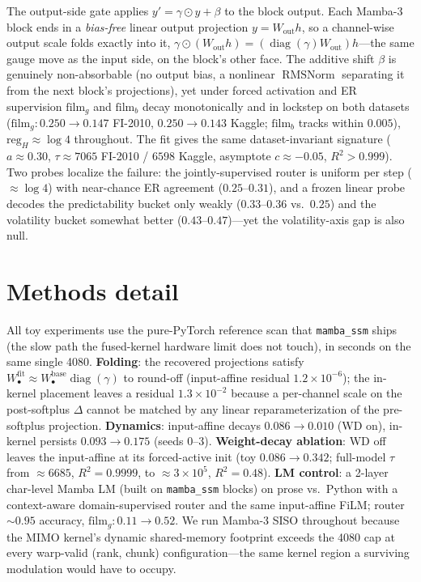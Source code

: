 \documentclass{article}
\DeclareMathOperator{\diagop}{diag}
\newcommand{\diag}{\diagop}
\DeclareMathOperator{\RMSNorm}{RMSNorm}
\begin{document}
The output-side gate applies $y'=\gamma\odot y+\beta$ to the block output. Each
Mamba-3 block ends in a \emph{bias-free} linear output projection
$y=W_{\text{out}}h$, so a channel-wise output scale folds exactly into it,
$\gamma\odot(W_{\text{out}}h)=(\diag(\gamma)W_{\text{out}})h$---the same gauge move
as the input side, on the block's other face. The additive shift $\beta$ is
genuinely non-absorbable (no output bias, a nonlinear $\RMSNorm$ separating it from
the next block's projections), yet under forced activation and ER supervision
$\mathrm{film}_g$ and $\mathrm{film}_b$ decay monotonically and in lockstep on both
datasets ($\mathrm{film}_g: 0.250\!\to\!0.147$ FI-2010, $0.250\!\to\!0.143$ Kaggle;
$\mathrm{film}_b$ tracks within $0.005$), $\mathrm{reg}_H\approx\log 4$ throughout.
The fit gives the same dataset-invariant signature ($a\approx0.30$,
$\tau\approx7065$ FI-2010 / $6598$ Kaggle, asymptote $c\approx-0.05$, $R^2>0.999$).
Two probes localize the failure: the jointly-supervised router is uniform per step
($\approx\log 4$) with near-chance ER agreement ($0.25$--$0.31$), and a frozen
linear probe decodes the predictability bucket only weakly ($0.33$--$0.36$ vs.\
$0.25$) and the volatility bucket somewhat better ($0.43$--$0.47$)---yet the
volatility-axis gap is also null.

\section{Methods detail}\label{app:methods}

All toy experiments use the pure-PyTorch reference scan that \texttt{mamba\_ssm}
ships (the slow path the fused-kernel hardware limit does not touch), in seconds on
the same single 4080. \textbf{Folding}: the recovered projections satisfy
$W_\bullet^{\text{fit}}\approx W_\bullet^{\text{base}}\diag(\gamma)$ to round-off
(input-affine residual $1.2\times10^{-6}$); the in-kernel placement leaves a
residual $1.3\times10^{-2}$ because a per-channel scale on the post-softplus
$\Delta$ cannot be matched by any linear reparameterization of the pre-softplus
projection. \textbf{Dynamics}: input-affine decays $0.086\!\to\!0.010$ (WD on),
in-kernel persists $0.093\!\to\!0.175$ (seeds 0--3). \textbf{Weight-decay
ablation}: WD off leaves the input-affine at its forced-active init (toy
$0.086\!\to\!0.342$; full-model $\tau$ from $\approx6685$, $R^2{=}0.9999$, to
$\approx3\times10^5$, $R^2{=}0.48$). \textbf{LM control}: a 2-layer char-level
Mamba LM (built on \texttt{mamba\_ssm} blocks) on prose vs.\ Python with a
context-aware domain-supervised router and the same input-affine FiLM; router
${\sim}0.95$ accuracy, $\mathrm{film}_g: 0.11\!\to\!0.52$. We run Mamba-3 SISO
throughout because the MIMO kernel's dynamic shared-memory footprint exceeds the
4080 cap at every warp-valid (rank, chunk) configuration---the same kernel region
a surviving modulation would have to occupy.
\end{document}
